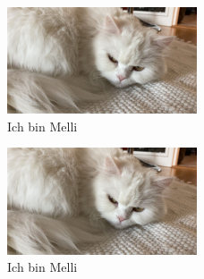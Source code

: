 \documentclass[ngerman,12pt]{scrartcl}
\begin{document}
\blindtext[3]


\begin{figure}[b] %
\includegraphics[width=0.5\textwidth]{Bilder/miau} %
\caption{Ich bin Melli}\label{fig:melli}
\end{figure}

\begin{figure}[b] %
\hfill
\includegraphics[width=0.5\textwidth]{Bilder/miau} %
\caption{Ich bin Melli}\label{fig:melli}
\end{figure}
\end{document}

